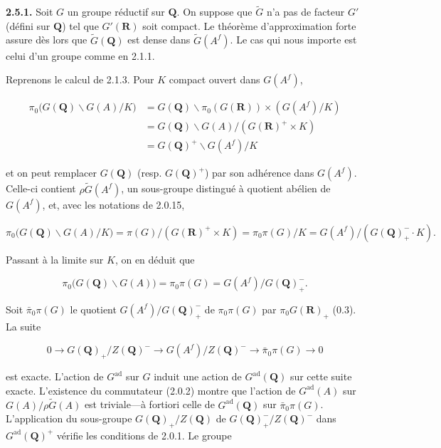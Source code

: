 \documentclass[10pt,a4paper]{article}
\begin{document}
\textbf{2.5.1.} Soit \(G\) un groupe réductif sur \(\mathbf Q\). On suppose que \(\widetilde G\) n'a pas de facteur \(G'\) (défini sur \(\mathbf Q\)) tel que \(G'(\mathbf R)\) soit compact. Le théorème d'approximation forte assure dès lors que \(\widetilde G(\mathbf Q)\) est dense dans \(\widetilde G(A^f)\). Le cas qui nous importe est celui d'un groupe comme en 2.1.1.

Reprenons le calcul de 2.1.3. Pour \(K\) compact ouvert dans \(G(A^f)\),

\[
\tag{2.5.1.1}
\begin{aligned}
\pi_0\bigl(G(\mathbf Q)\backslash G(A)/K\bigr)
&=G(\mathbf Q)\backslash\pi_0(G(\mathbf R))\times(G(A^f)/K)\\
&=G(\mathbf Q)\backslash G(A)/(G(\mathbf R)^+\times K)\\
&=G(\mathbf Q)^+\backslash G(A^f)/K
\end{aligned}
\]

et on peut remplacer \(G(\mathbf Q)\) (resp. \(G(\mathbf Q)^+\)) par son adhérence dans \(G(A^f)\). Celle-ci contient \(\rho\widetilde G(A^f)\), un sous-groupe distingué à quotient abélien de \(G(A^f)\), et, avec les notations de 2.0.15,

\[
\pi_0\bigl(G(\mathbf Q)\backslash G(A)/K\bigr)
=\pi(G)/(G(\mathbf R)^+\times K)
=\pi_0\pi(G)/K
=G(A^f)/(G(\mathbf Q)_+^{-}\cdot K). \tag{2.5.1.2}
\]

Passant à la limite sur \(K\), on en déduit que

\[
\pi_0\bigl(G(\mathbf Q)\backslash G(A)\bigr)=\pi_0\pi(G)=G(A^f)/G(\mathbf Q)_+^{-}.
\]

Soit \(\bar\pi_0\pi(G)\) le quotient \(G(A^f)/G(\mathbf Q)_+^{-}\) de \(\pi_0\pi(G)\) par \(\pi_0G(\mathbf R)_+\) (0.3). La suite

\[
0\longrightarrow G(\mathbf Q)_+/Z(\mathbf Q)^{-}
\longrightarrow G(A^f)/Z(\mathbf Q)^{-}
\longrightarrow\bar\pi_0\pi(G)\longrightarrow0 \tag{2.5.1.3}
\]

est exacte. L'action de \(G^{\mathrm{ad}}\) sur \(G\) induit une action de \(G^{\mathrm{ad}}(\mathbf Q)\) sur cette suite exacte. L'existence du commutateur (2.0.2) montre que l'action de \(G^{\mathrm{ad}}(A)\) sur \(G(A)/\rho\widetilde G(A)\) est triviale---à fortiori celle de \(G^{\mathrm{ad}}(\mathbf Q)\) sur \(\bar\pi_0\pi(G)\). L'application du sous-groupe \(G(\mathbf Q)_+/Z(\mathbf Q)\) de \(G(\mathbf Q)_+^{-}/Z(\mathbf Q)^{-}\) dans \(G^{\mathrm{ad}}(\mathbf Q)^+\) vérifie les conditions de 2.0.1. Le groupe
\end{document}
